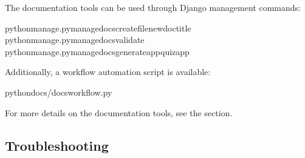 \documentclass[letterpaper,10pt,english]{sphinxmanual}
\begin{document}
\sphinxAtStartPar
The documentation tools can be used through Django management commands:

\begin{sphinxVerbatim}[commandchars=\\\{\}]
pythonmanage.pymanage\PYGZus{}docscreate\PYGZhy{}\PYGZhy{}filenew\PYGZus{}doc\PYGZhy{}\PYGZhy{}title
pythonmanage.pymanage\PYGZus{}docsvalidate
pythonmanage.pymanage\PYGZus{}docsgenerate\PYGZhy{}\PYGZhy{}appquiz\PYGZus{}app
\end{sphinxVerbatim}

\sphinxAtStartPar
Additionally, a workflow automation script is available:

\begin{sphinxVerbatim}[commandchars=\\\{\}]
pythondocs/docs\PYGZus{}workflow.py
\end{sphinxVerbatim}

\sphinxAtStartPar
For more details on the documentation tools, see the {\hyperref[\detokenize{documentation_tools::doc}]{}} section.


\subsection{Troubleshooting}
\label{\detokenize{installation:troubleshooting}}
\end{document}
